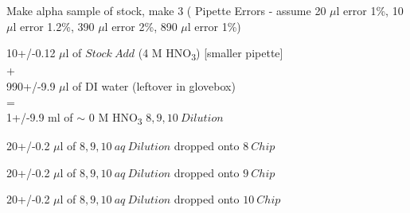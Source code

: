 \documentclass[idxtotoc,hyperref,openany,oneside]{labbook} %
\newcommand{\cmark}{\ding{51}}%
\newcommand{\done}{\rlap{$\square$}{\raisebox{2pt}{\large\hspace{1pt}\cmark}}%
  \hspace{-2.5pt}}
\newcommand{\tsbs}{\textsubscript}
\begin{document}

\begin{todolist}
  
\item[\done]{Make alpha sample of stock, make 3 (
      Pipette Errors - assume 20 $\mu$l error 1\%,
      10 $\mu$l error 1.2\%, 390 $\mu$l error 2\%, 890 $\mu$l error 1\%)}
\end{todolist}
\begin{center}
  10+/-0.12 $\mu$l of $\boxed{Stock\ Add}$ (4 M HNO\tsbs{3})
  [smaller pipette]\\
+\\
990+/-9.9 $\mu$l of DI water (leftover in glovebox)\\
=\\
1+/-9.9 ml of $\sim$ 0 M HNO\tsbs{3} $\boxed{8,9,10\ Dilution}$
\end{center}
\vspace{0.3cm}
\begin{center}
  20+/-0.2 $\mu$l of $\boxed{8,9,10\ aq\ Dilution}$ dropped onto
  $\boxed{8\ Chip}$
\end{center}
\begin{center}
  20+/-0.2 $\mu$l of $\boxed{8,9,10\ aq\ Dilution}$ dropped onto
  $\boxed{9\ Chip}$
\end{center}
\begin{center}
  20+/-0.2 $\mu$l of $\boxed{8,9,10\ aq\ Dilution}$ dropped onto
  $\boxed{10\ Chip}$
\end{center}
\end{document}
